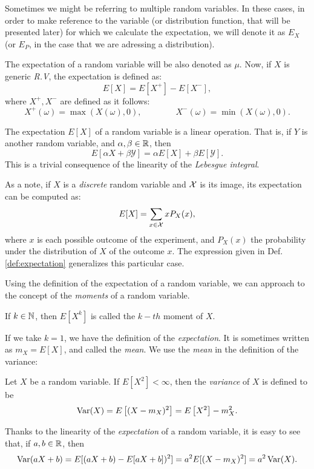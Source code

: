 Sometimes we might be referring to multiple random variables. In these cases, in order to make reference to the variable (or distribution function, that will be presented later) for which we calculate the expectation, we will denote it as $E_X$ (or $E_P$, in the case that we are adressing a distribution).

The expectation of a random variable will be also denoted as $\mu$. Now, if $X$ is generic \emph{R.V}, the expectation is defined as:
$$
E[X] = E[X^+] - E[X^-],
$$
where $X^+,X^-$ are defined as it follows:
$$
X^+(\omega) = \max(X(\omega),0), \quad \quad  \quad \quad X^-(\omega) = \min(X(\omega),0).
$$

The expectation $E[X]$ of a random variable is a linear operation. That is, if $Y$ is another random variable, and $\alpha,\beta \in \mathbb{R}$, then
$$
E[\alpha X + \beta \mathcal Y] = \alpha E[X] + \beta E[\mathcal Y].
$$
This is a trivial consequence of the linearity of the \emph{Lebesgue integral}.

As a note, if $X$ is a \emph{discrete} random variable and $\mathcal{X}$ is its image, its expectation can be computed as:
$$
E[X] = \sum_{x \in \mathcal{X}} x  P_X(x),
$$
where $x$ is each possible outcome of the experiment, and $P_X(x)$ the probability under the distribution of $X$ of the outcome $x$. 
The expression given in Def. \ref{def:expectation}  generalizes this particular case.

Using the definition of the expectation of a random variable, we can approach to the concept of the \emph{moments} of a random variable.

\begin{ndef}
If $k \in \mathbb N$, then $E[X^k]$ is called the $k-th$ moment of $X$.
\end{ndef}
If we take $k = 1$, we have the definition of the \emph{expectation}. It is sometimes written as $m_X = E[X]$, and called the \emph{mean}. We use the \emph{mean} in the definition of the variance:

\begin{ndef}
Let $X$ be a random variable. If $E\left[X^2\right] < \infty$, then the \emph{variance} of $X$ is defined to be
$$
\operatorname*{Var}(X) = E\left[(X - m_X)^2\right] = E\left[X^2\right] - m_X^2.
$$
\end{ndef}

Thanks to the linearity of the \emph{expectation} of a random variable, it is easy to see that, if $a,b \in \mathbb{R}$, then
$$
\operatorname*{Var}(aX + b) = E[(aX + b) - E[aX + b])^2] = a^2E[(X - m_X)^2] = a^2 \operatorname*{Var}(X).
$$

